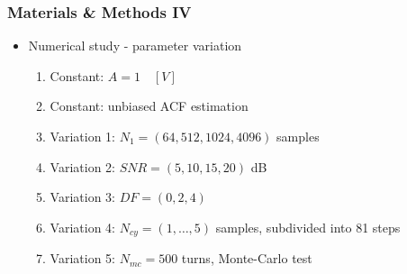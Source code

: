 \documentclass[11pt,aspectratio=169]{beamer}
\begin{document}
	\begin{frame}
		\frametitle{Materials \& Methods IV}
		\begin{itemize}
			\setlength\itemsep{0.5em}
			\item \textcolor{RIPtitlecol}{Numerical study - parameter variation}
			\begin{enumerate}
				\setlength\itemsep{0.5em}
				\item Constant: $A = 1 \quad [V]$
				\item Constant: unbiased ACF estimation
				\item Variation 1: $N_1 = (64, 512, 1024, 4096)$ samples
				\item Variation 2: $SNR = (5, 10, 15, 20)$ dB
				\item Variation 3: $DF = (0, 2, 4)$
				\item Variation 4: $N_{cy} = (1,\ldots,5)$ samples, subdivided into 81 steps
				\item Variation 5: $N_{mc} = 500$ turns, Monte-Carlo test
			\end{enumerate}
		\end{itemize}
		\vspace*{.5em}
	\end{frame}
\end{document}
